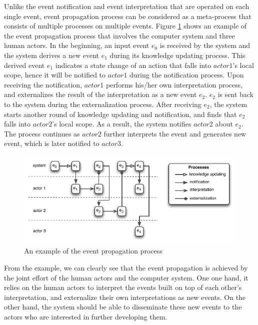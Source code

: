 Unlike the event notification and event interpretation that are operated on each single event, event propagation process can be considered as a meta-process that consists of multiple processes on multiple events. Figure \ref{fig:event_propagation} shows an example of the event propagation process that involves the computer system and three human actors. In the beginning, an input event $e_0$ is received by the system and the system derives a new event $e_1$ during its knowledge updating process. This derived event $e_1$ indicates a state change of an action that falls into $actor 1$'s local scope, hence it will be notified to $actor 1$ during the notification process. Upon receiving the notification, $actor 1$ performs his/her own interpretation process, and externalizes the result of the interpretation as a new event $e_2$. $e_2$ is sent back to the system during the externalization process. After receiving $e_2$, the system starts another round of knowledge updating and notification, and finds that $e_2$ falls into $actor 2$'s local scope. As a result, the system notifies $actor 2$ about $e_2$. The process continues as $actor 2$ further interprets the event and generates new event, which is later notified to $actor 3$.

\begin{figure}[htbp] %
	\centering
	\includegraphics{event_propagation.pdf} 
	\caption{An example of the event propagation process}
	\label{fig:event_propagation}
\end{figure}

From the example, we can clearly see that the event propagation is achieved by the joint effort of the human actors and the computer system. One one hand, it relies on the human actors to interpret the events built on top of each other's interpretation, and externalize their own interpretations as new events. On the other hand, the system should be able to disseminate these new events to the actors who are interested in further developing them.

